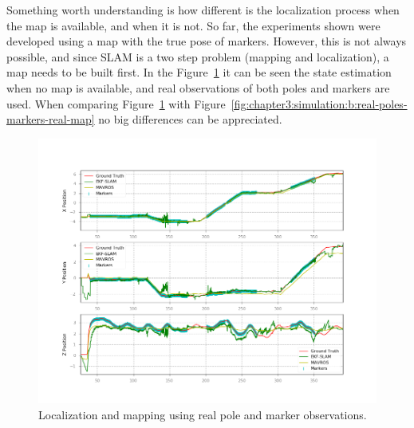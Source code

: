 Something worth understanding is how different is the localization process when the map is available, and when it is not. So far, the experiments shown were developed using a map with the true pose of markers. However, this is not always possible, and since \ac{SLAM} is a two step problem (mapping and localization), a map needs to be built first. In the Figure~\ref{fig:chapter3:simulation:b:real-poles-markers-no-map} it can be seen the state estimation when no map is available, and real observations of both poles and markers are used. When comparing Figure~\ref{fig:chapter3:simulation:b:real-poles-markers-no-map} with Figure~\ref{fig:chapter3:simulation:b:real-poles-markers-real-map} no big differences can be appreciated.\\
\begin{figure}
    \centering
    \includegraphics[width=\textwidth]{Images/fig22-true-poles-markers-nomap.png}
    \caption{Localization and mapping using real pole and marker observations.}
    \label{fig:chapter3:simulation:b:real-poles-markers-no-map}
\end{figure}

